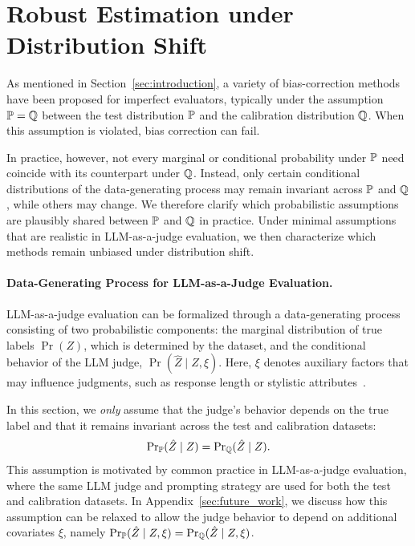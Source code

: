 \section{Robust Estimation under Distribution Shift}
\label{sec:other:estimator}




As mentioned in Section~\ref{sec:introduction}, a variety of bias-correction methods have been proposed for imperfect evaluators, typically under the assumption ${\mathbb{P}} = {\mathbb{Q}}$ between the test distribution ${\mathbb{P}}$ and the calibration distribution ${\mathbb{Q}}$. When this assumption is violated, bias correction can fail.

In practice, however, not every marginal or conditional probability under ${\mathbb{P}}$ need coincide with its counterpart under ${\mathbb{Q}}$. Instead, only certain conditional distributions of the data-generating process may remain invariant across ${\mathbb{P}}$ and ${\mathbb{Q}}$, while others may change. We therefore clarify which probabilistic assumptions are plausibly shared between ${\mathbb{P}}$ and ${\mathbb{Q}}$ in practice. Under minimal assumptions that are realistic in LLM-as-a-judge evaluation, we then characterize which methods remain unbiased under distribution shift.



\paragraph{Data-Generating Process for LLM-as-a-Judge Evaluation.}
LLM-as-a-judge evaluation can be formalized through a data-generating process consisting of two probabilistic components: the marginal distribution of true labels $\Pr(Z)$, which is determined by the dataset, and the conditional behavior of the LLM judge, $\Pr(\hat Z \mid Z,\xi)$.
Here, $\xi$ denotes auxiliary factors that may influence judgments,
such as response length or stylistic attributes~\citep{zhou2023instruction, dubois2024lengthcontrolled}.

In this section, we \emph{only} assume that the judge’s behavior depends on the true label and that it remains invariant across the test and calibration datasets:
\begin{align}
    \mathop{\rm Pr}\nolimits_{{\mathbb{P}}}(\hat Z \mid Z) = \mathop{\rm Pr}\nolimits_{{\mathbb{Q}}}(\hat Z \mid Z).
\end{align}
This assumption is motivated by common practice in LLM-as-a-judge evaluation, where the same LLM judge and prompting strategy are used for both the test and calibration datasets. In Appendix~\ref{sec:future_work}, we discuss how this assumption can be relaxed to allow the judge behavior to depend on additional covariates $\xi$, namely $\mathop{\rm Pr}\nolimits_{{\mathbb{P}}}(\hat Z \mid Z,\xi)=\mathop{\rm Pr}\nolimits_{{\mathbb{Q}}}(\hat Z \mid Z,\xi)$.

